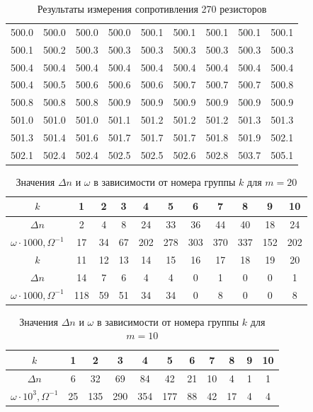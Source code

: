 \documentclass[14pt, a4paper]{article}
\begin{document}
\begin{table}
\begin{tabular}{c c c c c c c c c}
500.0 & 500.0 & 500.0 & 500.0 & 500.1 & 500.1 & 500.1 & 500.1 & 500.1 \\
500.1 & 500.2 & 500.3 & 500.3 & 500.3 & 500.3 & 500.3 & 500.3 & 500.3 \\
500.4 & 500.4 & 500.4 & 500.4 & 500.4 & 500.4 & 500.4 & 500.4 & 500.4 \\
500.4 & 500.5 & 500.6 & 500.6 & 500.6 & 500.7 & 500.7 & 500.7 & 500.8 \\
500.8 & 500.8 & 500.8 & 500.9 & 500.9 & 500.9 & 500.9 & 500.9 & 500.9 \\
501.0 & 501.0 & 501.0 & 501.1 & 501.2 & 501.2 & 501.2 & 501.3 & 501.3 \\
501.3 & 501.4 & 501.6 & 501.7 & 501.7 & 501.7 & 501.8 & 501.9 & 502.1 \\
502.1 & 502.4 & 502.4 & 502.5 & 502.5 & 502.6 & 502.8 & 503.7 & 505.1 \\

\end{tabular}
\caption{Результаты измерения сопротивления 270 резисторов}
\label{table1}
\end{table}

\begin{table}
\centering
\begin{tabular}{| c | c | c | c | c | c | c | c | c | c | c |}
\hline
$k$ & 1 & 2 & 3 & 4 & 5 & 6 & 7 & 8 & 9 & 10 \\
\hline
$\Delta n$ & 2 & 4 & 8 & 24 & 33 & 36 & 44 & 40 & 18 & 24 \\
\hline
$\omega\cdot1000, \Omega^{-1}$ & 17 & 34 & 67 & 202 & 278 & 303 & 370 & 337 & 152 & 202 \\
\hline
\hline
$k$ & 11 & 12 & 13 & 14 & 15 & 16 & 17 & 18 & 19 & 20 \\
\hline
$\Delta n$ & 14 & 7 & 6 & 4 & 4 & 0 & 1 & 0 & 0 & 1 \\
\hline
$\omega\cdot1000, \Omega^{-1}$ & 118 & 59 & 51 & 34 & 34 & 0 & 8 & 0 & 0 & 8 \\
\hline
\end{tabular}
\caption{Значения $\Delta n$ и $\omega$ в зависимости от номера группы $k$ для $m=20$}
\label{table2}
\end{table}

\begin{table}
\centering
\begin{tabular}{| c | c | c | c | c | c | c | c | c | c | c |}
\hline
$k$ & 1 & 2 & 3 & 4 & 5 & 6 & 7 & 8 & 9 & 10 \\
\hline
$\Delta n$ & 6 & 32 & 69 & 84 & 42 & 21 & 10 & 4 & 1 & 1 \\
\hline
$\omega\cdot10^3, \Omega^{-1}$ & 25 & 135 & 290 & 354 & 177 & 88 & 42 & 17 & 4 & 4 \\
\hline
\end{tabular}
\caption{Значения $\Delta n$ и $\omega$ в зависимости от номера группы $k$ для $m=10$}
\label{table3}
\end{table}
\end{document}
